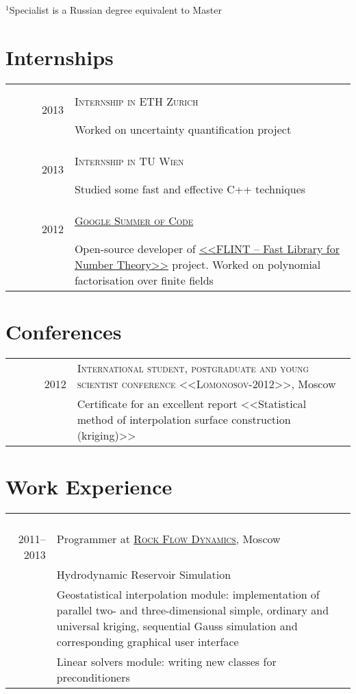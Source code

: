 \documentclass[a4paper,10pt]{article}
\begin{document}
\footnotesize{$^1$Specialist is a Russian degree equivalent to Master} \normalsize

\section{Internships}
\begin{tabular}{r|p{13cm}}
  \textcolor{white}{11111111} 2013 & \textsc{Internship in ETH Zurich} \\
 & \footnotesize Worked on uncertainty quantification project\\
  
 \multicolumn{2}{c}{} \\

\textcolor{white}{11111111} 2013 & \textsc{Internship in TU Wien} \\
 & \footnotesize Studied some fast and effective C++ techniques\\
  
 \multicolumn{2}{c}{} \\

 \textcolor{white}{11111111} 2012 & 
 \href{https://google-melange.appspot.com/gsoc/project/google/gsoc2012/kulakova_lina/26001}{\textsc{Google Summer of Code}}\\
 & \footnotesize{Open-source developer of \href{https://github.com/lina-kulakova/flint2}{<<FLINT -- Fast Library for Number Theory>>} project.
 Worked on polynomial factorisation over finite fields}
 
\end{tabular}

\section{Conferences}
\begin{tabular}{r|p{13cm}}
 \textcolor{white}{11111111} 2012 & \textsc{International student, postgraduate and young scientist conference <<Lomonosov-2012>>}, Moscow\\
 & \footnotesize{Certificate for an excellent report <<Statistical method of interpolation surface construction (kriging)>>}
\end{tabular}

\section{Work Experience}
\begin{tabular}{r|p{13cm}}
 \textcolor{white}{1} 2011--2013 & Programmer at \href{http://rfdyn.com/}{\textsc{Rock Flow Dynamics}}, Moscow \\
 & Hydrodynamic Reservoir Simulation\\
 & \footnotesize {Geostatistical interpolation module: implementation of parallel two- and three-dimensional simple, ordinary and universal kriging,
 sequential Gauss simulation and corresponding graphical user interface} \\
 &\footnotesize {Linear solvers module: writing new classes for preconditioners}\\
\end{tabular}
\end{document}

